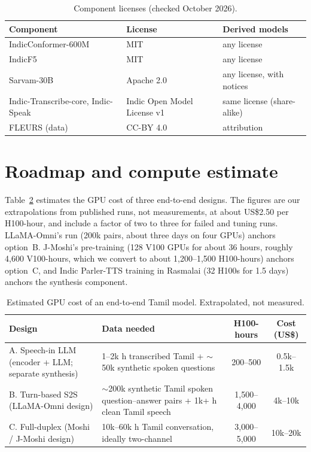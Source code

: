 \documentclass[11pt]{article}
\begin{document}
\begin{table}[t]
\centering\small
\caption{Component licenses (checked October 2026).}
\label{tab:license}
\begin{tabular}{lll}
\toprule
Component & License & Derived models \\
\midrule
IndicConformer-600M & MIT & any license \\
IndicF5 & MIT & any license \\
Sarvam-30B & Apache 2.0 & any license, with notices \\
Indic-Transcribe-core, Indic-Speak & Indic Open Model License v1 & same license (share-alike) \\
FLEURS (data) & CC-BY 4.0 & attribution \\
\bottomrule
\end{tabular}
\end{table}

\section{Roadmap and compute estimate}
\label{sec:roadmap}

Table~\ref{tab:cost} estimates the GPU cost of three end-to-end designs. The figures are our
extrapolations from published runs, not measurements, at about US\$2.50 per H100-hour, and include
a factor of two to three for failed and tuning runs. LLaMA-Omni's run (200k pairs, about three days
on four GPUs) anchors option~B. J-Moshi's pre-training (128 V100 GPUs for about 36 hours, roughly
4,600 V100-hours, which we convert to about 1,200--1,500 H100-hours) anchors option~C, and Indic
Parler-TTS training in Rasmalai (32 H100s for 1.5 days) anchors the synthesis component.

\begin{table}[t]
\centering\small
\caption{Estimated GPU cost of an end-to-end Tamil model. Extrapolated, not measured.}
\label{tab:cost}
\begin{tabular}{p{3.2cm}p{5.6cm}cc}
\toprule
Design & Data needed & H100-hours & Cost (US\$) \\
\midrule
A. Speech-in LLM (encoder + LLM; separate synthesis) & 1--2k h transcribed Tamil + $\sim$50k synthetic spoken questions & 200--500 & 0.5k--1.5k \\
B. Turn-based S2S (LLaMA-Omni design) & $\sim$200k synthetic Tamil spoken question--answer pairs + 1k+ h clean Tamil speech & 1,500--4,000 & 4k--10k \\
C. Full-duplex (Moshi / J-Moshi design) & 10k--60k h Tamil conversation, ideally two-channel & 3,000--5,000 & 10k--20k \\
\bottomrule
\end{tabular}
\end{table}
\end{document}
